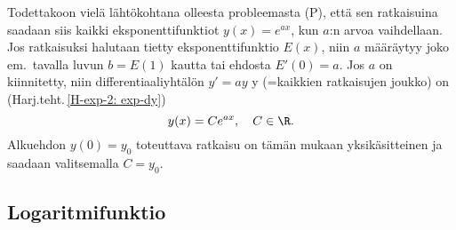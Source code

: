 Todettakoon vielä lähtökohtana olleesta probleemasta (P), että sen ratkaisuina saadaan siis 
kaikki eksponenttifunktiot $y(x)=e^{ax}$, kun $a$:n arvoa vaihdellaan. Jos ratkaisuksi
halutaan tietty eksponenttifunktio $E(x)$, niin $a$ määräytyy joko em.\ tavalla luvun
$b=E(1)$ kautta tai ehdosta $E'(0)=a$. Jos $a$ on kiinnitetty, niin differentiaaliyhtälön
$y'=ay$ y  (=kaikkien ratkaisujen joukko) on
(Harj.teht.\,\ref{H-exp-2: exp-dy})
\[
y(x)=Ce^{ax}, \quad C\in\R.
\]
Alkuehdon $y(0)=y_0$ toteuttava ratkaisu on tämän mukaan yksikäsitteinen ja saadaan
valitsemalla $C=y_0$.

\subsection{Logaritmifunktio}

